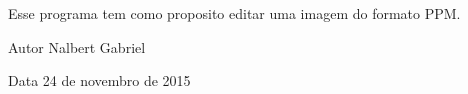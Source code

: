 Esse programa tem como proposito editar uma imagem do formato P\+P\+M. \begin{DoxyAuthor}{Autor}
Nalbert Gabriel 
\end{DoxyAuthor}
\begin{DoxyDate}{Data}
24 de novembro de 2015 
\end{DoxyDate}
